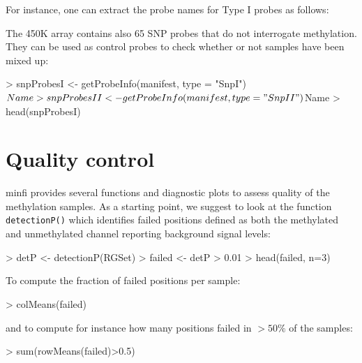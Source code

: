 \documentclass[12pt]{article}
\newcommand{\software}[1]{\textsf{#1}}
\newcommand{\minfi}{\software{minfi}}
\begin{document}
For instance, one can extract the probe names for Type I probes as follows:
\begin{Schunk}
\end{Schunk}
The 450K array contains also 65 SNP probes that do not interrogate methylation. They can be used as control probes to check whether or not samples have been mixed up:
\begin{Schunk}
\begin{Sinput}
> snpProbesI <- getProbeInfo(manifest, type = "SnpI")$Name
> snpProbesII <- getProbeInfo(manifest, type = "SnpII")$Name
> head(snpProbesI)
\end{Sinput}
\end{Schunk}
\section{Quality control}
\minfi{} provides several functions and diagnostic plots to assess quality of the methylation samples. As a starting point, we suggest to look at the function \texttt{detectionP()} which identifies failed positions defined as both the methylated and unmethylated channel reporting background signal levels:
\begin{Schunk}
\begin{Sinput}
> detP <- detectionP(RGSet)
> failed <- detP > 0.01
> head(failed, n=3)
\end{Sinput}
\end{Schunk}
To compute the fraction of failed positions per sample:
\begin{Schunk}
\begin{Sinput}
> colMeans(failed) 
\end{Sinput}
\end{Schunk}
and to compute for instance how many positions failed in $>50\%$ of the samples: 
\begin{Schunk}
\begin{Sinput}
> sum(rowMeans(failed)>0.5)
\end{Sinput}
\end{Schunk}
\end{document}
